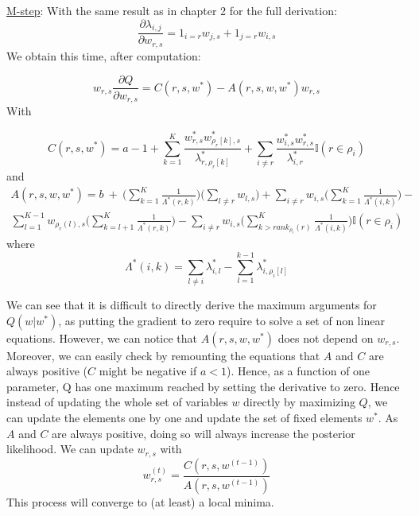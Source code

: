 \documentclass[12pt]{ociamthesis}  %
\begin{document}
	\underline{M-step}: With the same result as in chapter 2 for the full derivation:
	\begin{equation}
	\frac{\partial \lambda_{i,j}}{\partial w_{r,s}} = 1_{i = r} w_{j,s} + 1_{j = r} w_{i,s}
	\end{equation}
	We obtain this time, after computation:
	
	\begin{equation}
	w_{r,s} \frac{\partial Q}{\partial w_{r,s}} = C(r,s,w^{*}) - A(r,s,w,w^{*})w_{r,s}
	\end{equation}
	With
	
	\begin{equation}
	C(r,s,w^{*}) = a - 1 + \sum_{k = 1}^{K}\frac{w^{*}_{r,s}w^{*}_{\rho_{r}[k],s}}{\lambda^{*}_{r,\rho_{r}[k]}} + \sum_{i \neq r} \frac{w^{*}_{i,s}w^{*}_{r,s}}{\lambda^{*}_{i,r}} \mathbb{I}(r \in \rho_{i})
	\end{equation} and
	\begin{multline}
	A(r,s,w,w^{*}) = b \ + \ \bigg( \sum_{k = 1}^{K} \frac{1}{\Lambda^{*}(r,k)} \bigg) \bigg( \sum_{l \neq r} w_{l,s} \bigg) + \sum_{i \neq r} w_{i,s} \bigg( \sum_{k = 1}^{K} \frac{1}{\Lambda^{*}(i,k)} \bigg) - \\ \sum_{l = 1}^{K-1} w_{\rho_{r}(l), s} \bigg( \sum_{k = l+1}^{K} \frac{1}{\Lambda^{*}(r,k)} \bigg) - \sum_{i \neq r} w_{i,s} \bigg( \sum_{k > rank_{\rho_{i}}(r)}^{K} \frac{1}{\Lambda^{*}(i,k)} \bigg)\mathbb{I}(r \in \rho_{i})
	\end{multline} where
	\begin{equation}
	\Lambda^{*}(i,k) = \sum_{l \neq i} \lambda^{*}_{i,l} - \sum_{l = 1}^{k-1} \lambda^{*}_{i,\rho_{i}[l]}
	\end{equation}
	
	We can see that it is difficult to directly derive the maximum arguments for $Q(w|w^{*})$, as putting the gradient to zero require to solve a set of non linear equations. However, we can notice that $A(r,s,w,w^{*})$ does not depend on $w_{r,s}$. Moreover, we can easily check by remounting the equations that $A$ and $C$ are always positive ($C$ might be negative if $a < 1$). Hence, as a function of one parameter, Q has one maximum reached by setting the derivative to zero. Hence instead of updating the whole set of variables $w$ directly by maximizing $Q$, we can update the elements one by one and update the set of fixed elements $w^{*}$. As $A$ and $C$ are always positive, doing so will always increase the posterior likelihood. We can update $w_{r,s}$ with
	\begin{equation}
	w^{(t)}_{r,s} = \frac{C(r,s,w^{(t-1)})}{A(r,s,w^{(t-1)})}
	\end{equation}
	This process will converge to (at least) a local minima.
	\newpage
\end{document}
